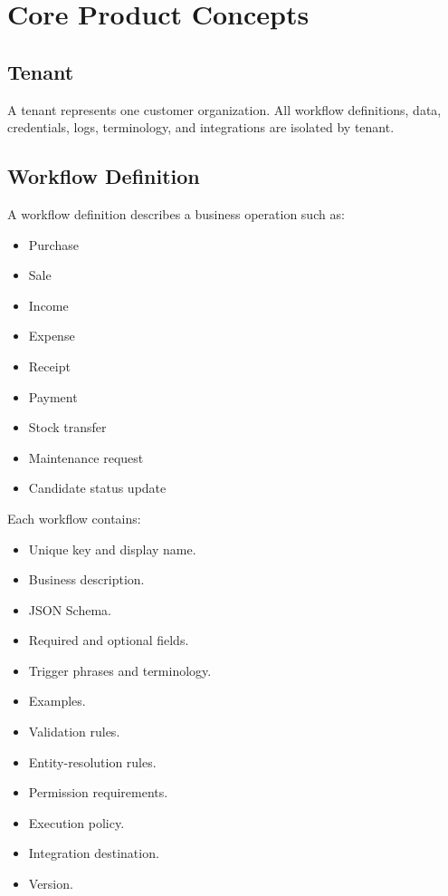 \documentclass[11pt,a4paper]{article}
\begin{document}
\section{Core Product Concepts}

\subsection{Tenant}

A tenant represents one customer organization. All workflow definitions,
data, credentials, logs, terminology, and integrations are isolated by
tenant.

\subsection{Workflow Definition}

A workflow definition describes a business operation such as:

\begin{itemize}
\item Purchase
\item Sale
\item Income
\item Expense
\item Receipt
\item Payment
\item Stock transfer
\item Maintenance request
\item Candidate status update
\end{itemize}

Each workflow contains:

\begin{itemize}
\item Unique key and display name.
\item Business description.
\item JSON Schema.
\item Required and optional fields.
\item Trigger phrases and terminology.
\item Examples.
\item Validation rules.
\item Entity-resolution rules.
\item Permission requirements.
\item Execution policy.
\item Integration destination.
\item Version.
\end{itemize}
\end{document}
